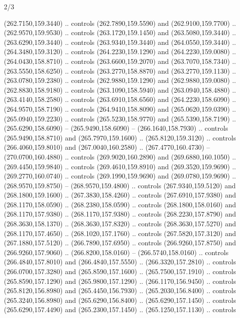\begin{flagdescription}{2/3}
\begin{scope}[xshift=0.5\flaglength,yshift=0.5\flagwidth,scale=\flagwidth/259.2]
\begin{scope}[y=0.8pt, x=0.8pt, yscale=-1,shift={(-243,-162)}]
      (262.7150,159.3440) .. controls (262.7890,159.5590) and (262.9100,159.7700) ..
      (262.9570,159.9530) .. controls (263.1720,159.1450) and (263.5080,159.3440) ..
      (263.6290,159.3440) .. controls (263.9340,159.3440) and (264.0550,159.3440) ..
      (264.3480,159.3120) .. controls (264.2230,159.1290) and (264.2230,159.0080) ..
      (264.0430,158.8710) .. controls (263.6600,159.2070) and (263.7070,158.7340) ..
      (263.5550,158.6250) .. controls (263.2770,158.8870) and (263.2770,159.1130) ..
      (263.0780,159.2380) .. controls (262.9880,159.1290) and (262.9880,159.0080) ..
      (262.8830,158.9180) .. controls (263.1090,158.5940) and (263.0940,158.4880) ..
      (263.4140,158.2580) .. controls (263.6910,158.6560) and (264.2230,158.6090) ..
      (264.9570,158.7190) .. controls (264.9410,158.8090) and (265.0620,159.0390) ..
      (265.0940,159.2230) .. controls (265.5230,158.9770) and (265.5390,158.7190) ..
      (265.6290,158.6090) -- (265.9490,158.6090) -- (266.1640,158.7930) .. controls
      (265.9490,158.8710) and (265.7970,159.1600) .. (265.8120,159.3120) .. controls
      (266.4060,159.8010) and (267.0040,160.2580) .. (267.4770,160.4730) --
      (270.0700,160.4880) .. controls (269.9020,160.2890) and (269.6880,160.1050) ..
      (269.4450,159.9840) .. controls (269.4610,159.8910) and (269.3520,159.9690) ..
      (269.2770,160.0740) .. controls (269.1990,159.9690) and (269.0780,159.9690) ..
      (268.9570,159.8750) -- (268.9570,159.4800) .. controls (267.9340,159.5120) and
      (268.1800,159.1600) .. (267.3830,158.4260) .. controls (267.6910,157.9380) and
      (268.1170,158.0590) .. (268.2380,158.0590) .. controls (268.1800,158.0160) and
      (268.1170,157.9380) .. (268.1170,157.9380) .. controls (268.2230,157.8790) and
      (268.3630,158.1370) .. (268.3630,157.8320) .. controls (268.3630,157.5270) and
      (268.1170,157.4650) .. (268.1020,157.1760) .. controls (267.5820,157.3120) and
      (267.1880,157.5120) .. (266.7890,157.6950) .. controls (266.9260,157.8750) and
      (266.9260,157.9060) .. (266.8200,158.0160) -- (266.5740,158.0160) .. controls
      (266.4840,157.8010) and (266.4840,157.5550) .. (266.3320,157.2810) .. controls
      (266.0700,157.3280) and (265.8590,157.1600) .. (265.7500,157.1910) .. controls
      (265.8590,157.1290) and (265.9800,157.1290) .. (266.1170,156.9450) .. controls
      (265.8120,156.8980) and (265.4450,156.7930) .. (265.2030,156.8400) .. controls
      (265.3240,156.8980) and (265.6290,156.8400) .. (265.6290,157.1450) .. controls
      (265.6290,157.4490) and (265.2300,157.1450) .. (265.1250,157.1130) .. controls

\end{scope}
\end{scope}
\end{flagdescription}

